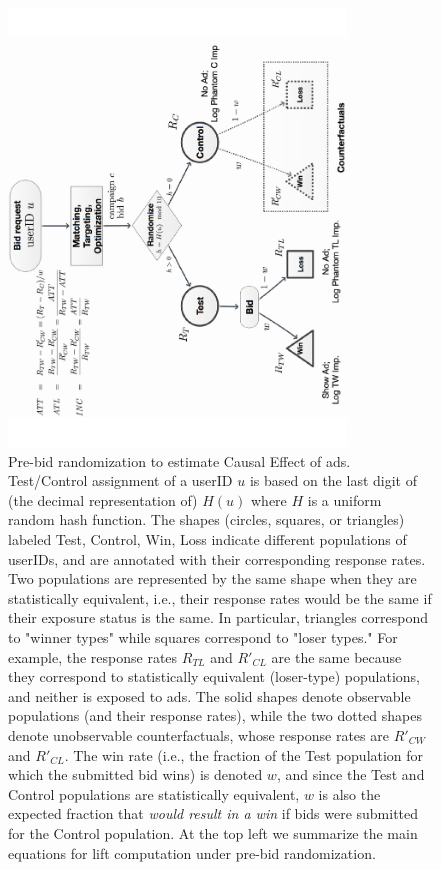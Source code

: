 \documentclass[11pt,a4paper]{article}
\theoremstyle{definition}
\theoremstyle{remark}
\theoremstyle{definition}
\theoremstyle{definition}
\theoremstyle{definition}
\theoremstyle{definition}
\theoremstyle{definition}
\theoremstyle{definition}
\begin{document}
\begin{figure} \small \centering
\includegraphics[width=0.8\textwidth,angle=270]{pre-bid-eq.pdf}
\caption{\small Pre-bid randomization to estimate Causal Effect of ads. Test/Control assignment of a userID $u$ is based on the last digit of (the decimal representation of) $H(u)$ where $H$ is a uniform random hash function. 
The shapes (circles, squares, or triangles) labeled Test, Control, Win, Loss indicate different populations of userIDs, and are annotated with their corresponding response rates. 
Two populations are represented by the same shape when they are statistically equivalent, i.e., their response rates would be the same if their exposure status is the same. In particular, triangles correspond to "winner types" while squares correspond to "loser types." 
For example, the response rates $R_{TL}$ and $R'_{CL}$ are the same because they correspond to statistically equivalent (loser-type) populations, and neither is exposed to ads.
The solid shapes denote observable populations (and their response rates), while the two dotted shapes denote unobservable counterfactuals, whose response rates are $R'_{CW}$ and $R'_{CL}$. The win rate (i.e., the fraction of the Test population for which the submitted bid wins) is denoted $w$, and since the Test and Control populations are statistically equivalent, $w$ is also the expected fraction that \textit{would result in a win} if bids were submitted for the Control population. At the top left we summarize the main equations for lift computation under pre-bid randomization.
}
\label{fig-prebid-flow}
\end{figure}
\end{document}
